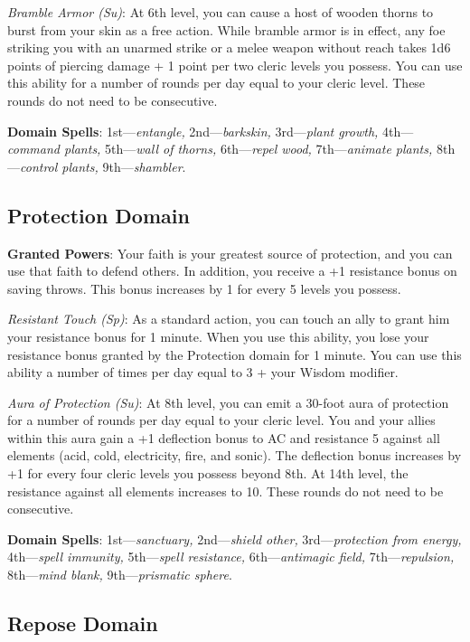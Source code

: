 \textit{Bramble Armor (Su)}: At 6th level, you can cause a host of wooden thorns to burst from your skin as a free action. While bramble armor is in effect, any foe striking you with an unarmed strike or a melee weapon without reach takes 1d6 points of piercing damage + 1 point per two cleric levels you possess. You can use this ability for a number of rounds per day equal to your cleric level. These rounds do not need to be consecutive.
				
\textbf{Domain Spells}: 1st---\textit{entangle, }2nd---\textit{barkskin,} 3rd---\textit{plant growth, }4th---\textit{command plants, }5th---\textit{wall of thorns, }6th---\textit{repel wood, }7th---\textit{animate plants, }8th---\textit{control plants, }9th---\textit{shambler}.
				
\subsection{Protection Domain}

				
\textbf{Granted Powers}: Your faith is your greatest source of protection, and you can use that faith to defend others. In addition, you receive a +1 resistance bonus on saving throws. This bonus increases by 1 for every 5 levels you possess. 
				
\textit{Resistant Touch (Sp)}: As a standard action, you can touch an ally to grant him your resistance bonus for 1 minute. When you use this ability, you lose your resistance bonus granted by the Protection domain for 1 minute. You can use this ability a number of times per day equal to 3 + your Wisdom modifier.
				
\textit{Aura of Protection (Su)}: At 8th level, you can emit a 30-foot aura of protection for a number of rounds per day equal to your cleric level. You and your allies within this aura gain a +1 deflection bonus to AC and resistance 5 against all elements (acid, cold, electricity, fire, and sonic). The deflection bonus increases by +1 for every four cleric levels you possess beyond 8th. At 14th level, the resistance against all elements increases to 10. These rounds do not need to be consecutive.
				
\textbf{Domain Spells}: 1st---\textit{sanctuary, }2nd---\textit{shield other,} 3rd---\textit{protection from energy, }4th---\textit{spell immunity, }5th---\textit{spell resistance, }6th---\textit{antimagic field, }7th---\textit{repulsion, }8th---\textit{mind blank, }9th---\textit{prismatic sphere}.
				
\subsection{Repose Domain}


